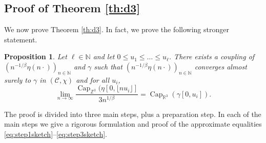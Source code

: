 \documentclass{article}
\DeclareMathOperator{\C}{Cap}
\newcommand{\R}{\mathbb{R}}
\newcommand{\Z}{\mathbb{Z}}
\newcommand{\N}{\mathbb{N}}
\newcommand{\1}{\mathbf{1}}
\newcommand{\limn}{\lim_{n\rightarrow\infty}}
\newcommand{\Cz}{\C_{\Z^3}}
\newcommand{\Cr}{\C_{\R^3}}
\newtheorem{proposition}[theorem]{Proposition}
\theoremstyle{definition}
\numberwithin{equation}{section}
\numberwithin{theorem}{section}
\begin{document}
\subsection{Proof of Theorem \ref{th:d3}}\label{sec:d3proofsub}
We now prove Theorem \ref{th:d3}. In fact, we prove the following stronger statement.
\begin{proposition}\label{prop:d3-general}
Let $\ell\in\N$ and let $0\leq u_1\leq\ldots\leq u_{\ell}$. There exists a coupling of $(n^{-1/\beta}\eta(n\cdot))_{n\in\N}$ and $\gamma$ such that $(n^{-1/\beta}\eta(n\cdot))_{n\in\N}$ converges almost surely to $\gamma$ in $(\mathcal{C},\chi)$ and for all $u_i$,
\begin{equation}
    \limn\frac{\Cz(\eta[0,\lfloor nu_i\rfloor]}{3n^{1/\beta}}=\Cr(\gamma[0,u_i]).
\end{equation}
\end{proposition}
The proof is divided into three main steps, plus a preparation step. In each of the main steps we give a rigorous formulation and proof of the approximate equalities \eqref{eq:step1sketch}--\eqref{eq:step3sketch}.
\end{document}

